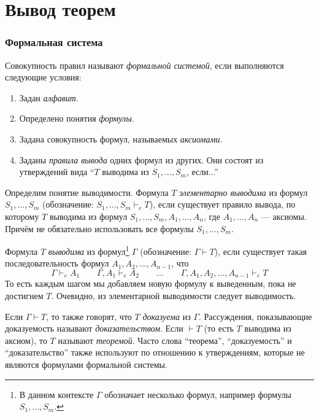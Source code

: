\part{Вывод теорем}

\section{Формальная система}

Совокупность правил называют {\it формальной системой},
если выполняются следующие условия:
\begin{enumerate}
  \item{}Задан {\it алфавит}.
  \item{}Определено понятия {\it формулы}.
  \item{}Задана совокупность формул, называемых {\it аксиомами}.
  \item{}Заданы {\it правила вывода} одних формул из других.
  Они состоят из утверждений вида ``$T$ выводима из $S_1,...,S_{m}$, если...''
\end{enumerate}

\newcommand\Sx{\mathcal S}
\newcommand\Ax{\mathcal A}
Определим понятие выводимости. Формула $T$ {\it элементарно выводима}
из формул $S_1,...,S_{m}$ (обозначение: $S_1,...,S_{m}\vdash_{e} T$),
если существует правило вывода, по которому $T$ выводима из формул
$S_1,...,S_{m},A_1,...,A_{n}$, где $A_1,...,A_{n}$ --- аксиомы.
Причём не обязательно использовать все формулы $S_1,...,S_{m}$.

Формула $T$ {\it выводима} из формул\footnote{В данном контексте
$\Gamma$ обозначает несколько формул, например формулы $S_1,...,S_{m}$.} $\Gamma$
(обозначение: $\Gamma\vdash T$), если существует такая последовательность
формул $A_1,A_2,...,A_{n-1}$, что
\[
  \Gamma\vdash_{e} A_1\qquad \Gamma,A_1\vdash_{e} A_2\qquad...\qquad
  \Gamma,A_1,A_2,...,A_{n-1}\vdash_{e} T
\]
То есть каждым шагом мы добавляем новую формулу к выведенным, пока
не достигнем $T$.
Очевидно, из элементарной выводимости следует выводимость.

Если $\Gamma\vdash T$, то также говорят, что $T$ {\it доказуема} из $\Gamma$.
Рассуждения, показывающие доказуемость называют
{\it доказательством}. Если $\vdash T$ (то есть $T$ выводима из аксиом),
то $T$ называют {\it теоремой}.
Часто слова ``теорема'', ``доказуемость'' и ``доказательство'' также используют по
отношению к утверждениям, которые не являются формулами формальной системы.

